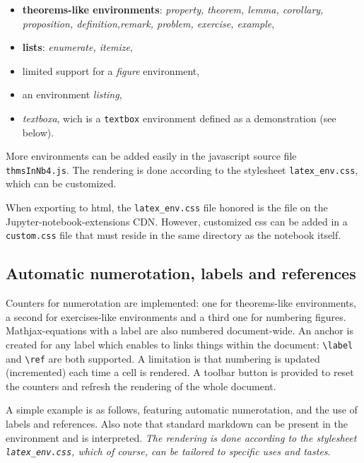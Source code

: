     \begin{itemize}
\tightlist
\item
  \textbf{theorems-like environments}: \emph{property, theorem, lemma,
  corollary, proposition, definition,remark, problem, exercise,
  example},
\item
  \textbf{lists}: \emph{enumerate, itemize},\\
\item
  limited support for a \emph{figure} environment,
\item
  an environment \emph{listing},
\item
  \emph{textboxa}, wich is a \texttt{textbox} environment defined as a
  demonstration (see below).
\end{itemize}

More environments can be added easily in the javascript source file
\texttt{thmsInNb4.js}. The rendering is done according to the stylesheet
\texttt{latex\_env.css}, which can be customized.

\begin{remark}
When exporting to html, the
\texttt{latex\_env.css} file honored is the file on the
Jupyter-notebook-extensions CDN. However, customized css can be added in
a \texttt{custom.css} file that must reside in the same directory as the
notebook itself. 
\end{remark}

    \subsection{Automatic numerotation, labels and
references}\label{automatic-numerotation-labels-and-references}

    Counters for numerotation are implemented: one for theorems-like
environments, a second for exercises-like environments and a third one
for numbering figures.\\
Mathjax-equations with a label are also numbered document-wide. An
anchor is created for any label which enables to links things within the
document: \texttt{\textbackslash{}label} and
\texttt{\textbackslash{}ref} are both supported. A limitation is that
numbering is updated (incremented) each time a cell is rendered. A
toolbar button is provided to reset the counters and refresh the
rendering of the whole document.

    \label{example:mixing} A simple example is as follows, featuring
automatic numerotation, and the use of labels and references. Also note
that standard markdown can be present in the environment and is
interpreted. \emph{The rendering is done according to the stylesheet
\texttt{latex\_env.css}, which of course, can be tailored to specific
uses and tastes}.

